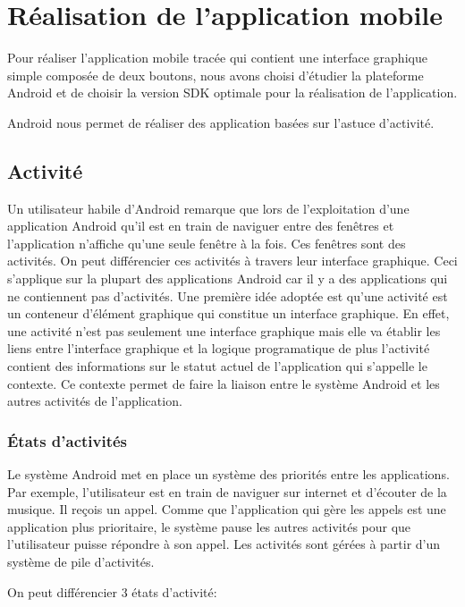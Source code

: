 \section{Réalisation de l'application mobile}

Pour réaliser l'application mobile tracée qui contient une interface graphique
simple composée de deux boutons, nous avons choisi d'étudier la plateforme Android et
de choisir la version SDK optimale pour la réalisation de l'application.

Android nous permet de réaliser des application basées sur l'astuce d'activité.

\subsection{Activité}

Un utilisateur habile d'Android remarque que lors de l'exploitation d'une
application Android qu'il est en train de naviguer entre des fenêtres et
l'application n'affiche qu'une seule fenêtre à la fois. Ces fenêtres sont
des activités. On peut différencier ces activités à travers leur interface
graphique. Ceci s'applique sur la plupart des applications Android car il y a des
applications qui ne contiennent pas d'activités. Une première idée adoptée est qu'une activité est un conteneur d'élément graphique qui
constitue un interface graphique. En effet, une activité n'est pas
seulement une interface graphique mais elle va établir les liens entre
l'interface graphique et la logique programatique de plus l'activité contient
des informations sur le statut actuel de l'application qui s'appelle le
contexte. Ce contexte permet de faire la liaison entre le système Android et les
autres activités de l'application.

\subsubsection{États d'activités}

Le système Android met en place un système des priorités entre les applications.
Par exemple, l'utilisateur est en train de naviguer sur internet et d'écouter de la
musique. Il reçois un appel. Comme que l'application qui gère les appels est une
application plus prioritaire, le système pause les autres activités
pour que l'utilisateur puisse répondre à son appel. Les
activités sont gérées à partir d'un système de pile d'activités.

On peut différencier 3 états d'activité:

